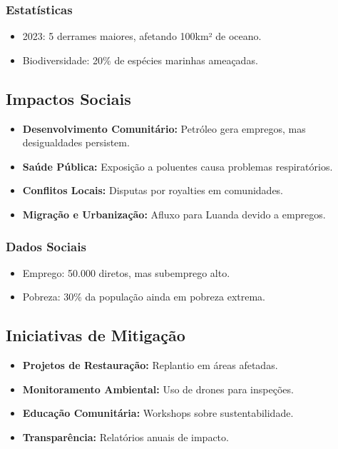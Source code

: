 \documentclass[12pt]{article}
\begin{document}
\subsubsection{Estatísticas}
\begin{itemize}
    \item 2023: 5 derrames maiores, afetando 100km² de oceano.
    \item Biodiversidade: 20\% de espécies marinhas ameaçadas.
\end{itemize}

\subsection{Impactos Sociais}
\begin{itemize}
    \item \textbf{Desenvolvimento Comunitário:} Petróleo gera empregos, mas desigualdades persistem.
    \item \textbf{Saúde Pública:} Exposição a poluentes causa problemas respiratórios.
    \item \textbf{Conflitos Locais:} Disputas por royalties em comunidades.
    \item \textbf{Migração e Urbanização:} Afluxo para Luanda devido a empregos.
\end{itemize}

\subsubsection{Dados Sociais}
\begin{itemize}
    \item Emprego: 50.000 diretos, mas subemprego alto.
    \item Pobreza: 30\% da população ainda em pobreza extrema.
\end{itemize}

\subsection{Iniciativas de Mitigação}
\begin{itemize}
    \item \textbf{Projetos de Restauração:} Replantio em áreas afetadas.
    \item \textbf{Monitoramento Ambiental:} Uso de drones para inspeções.
    \item \textbf{Educação Comunitária:} Workshops sobre sustentabilidade.
    \item \textbf{Transparência:} Relatórios anuais de impacto.
\end{itemize}
\end{document}
